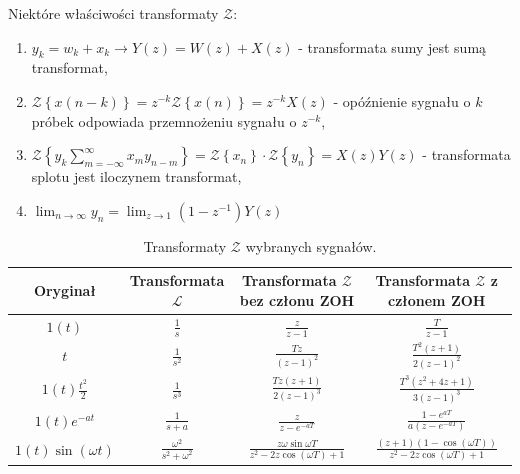 \documentclass{article}
\begin{document}
        Niektóre właściwości transformaty $\mathcal{Z}$:
        \begin{enumerate}
            \item $y_{k} = w_{k} + x_{k} \rightarrow Y(z) = W(z) + X(z)$ - transformata sumy jest sumą transformat,
            \item $\mathcal{Z}\left\{ x(n-k) \right\} = z^{-k}\mathcal{Z}\left\{ x(n) \right\} = z^{-k}X(z)$ - opóźnienie sygnału o $k$ próbek odpowiada przemnożeniu sygnału o $z^{-k}$,
            \item $\mathcal{Z}\left\{y_{k} \sum_{m=-\infty}^{\infty}{x_m}y_{n-m} \right\} = \mathcal{Z}\left\{ x_{n} \right\}\cdot \mathcal{Z}\left\{ y_{n} \right\} = X(z)Y(z)$ - transformata splotu jest iloczynem transformat,
            \item $\lim_{n\rightarrow\infty}y_{n} = \lim_{z\rightarrow 1}{(1-z^{-1})}Y(z)$
        \end{enumerate}

        
        \begin{table}[H]
            \centering
            \begin{tabular}{|c|c|c|c|}
                \hline
                Oryginał    &   Transformata $\mathcal{L}$  &   Transformata $\mathcal{Z}$ bez członu ZOH   & Transformata $\mathcal{Z}$ z członem ZOH\\
                \hline
                $1(t)$  &   $\frac{1}{s}$   &   $\frac{z}{z-1}$ &   $\frac{T}{z-1}$\\
                \hline
                $t$     &   $\frac{1}{s^2}$ &   $\frac{Tz}{(z-1)^2}$    &   $\frac{T^{2}(z+1)}{2(z-1)^{2}}$\\
                \hline
                $1(t)\frac{t^2}{2}$ &   $\frac{1}{s^3}$  &  $\frac{Tz(z+1)}{2(z-1)^3}$  &   $\frac{T^{3}(z^{2}+4z+1)}{3(z-1)^{3}}$\\
                \hline
                $1(t)e^{-at}$ & $\frac{1}{s+a}$ &   $\frac{z}{z-e^{-aT}}$  &    $\frac{1-e^{aT}}{a(z-e^{-aT})}$ \\
                \hline
                $1(t)\sin{(\omega t)}$  &   $\frac{\omega^2}{s^2 + \omega^2}$  &    $\frac{z\omega\sin{\omega T}}{z^2 - 2z\cos{(\omega T)} + 1}$  & $\frac{(z+1)(1-\cos{(\omega T)})}{z^2 - 2z\cos{(\omega T)}+1}$ \\
                \hline
            \end{tabular}
            \caption{Transformaty $\mathcal{Z}$ wybranych sygnałów.}
            \label{tab:transformata_z_sygnaly}
        \end{table}
\end{document}
